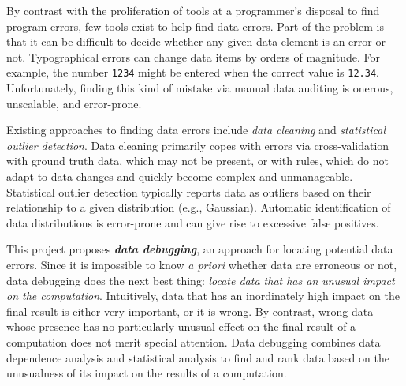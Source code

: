 


By contrast with the proliferation of tools at a programmer's disposal
to find program errors, few tools exist to help find data errors. Part
of the problem is that it can be difficult to decide whether any given
data element is an error or not. Typographical errors can change data items by
orders of magnitude. For example, the
number \texttt{1234} might be entered when the correct value is \texttt{12.34}. Unfortunately, finding this kind of mistake via
manual data auditing is onerous, unscalable, and error-prone.




Existing approaches to finding data errors include
\emph{data cleaning} and  \emph{statistical outlier detection}.
Data cleaning primarily copes with errors via
cross-validation with ground truth data, which may not be
present, or with rules, which do not adapt to data changes and quickly become complex and unmanageable. Statistical outlier detection typically reports data as
outliers based on their relationship to a given distribution (e.g.,
Gaussian).  Automatic identification of data distributions is
error-prone and can give rise to excessive false positives.



This project proposes \emph{\bf data debugging}, an approach for locating
potential data errors. Since it is impossible to know \emph{a priori}
whether data are erroneous or not, data debugging does the next best
thing: \emph{locate data that has an unusual
impact on the computation}. Intuitively, data that has an inordinately high impact on the final
result is either very important, or it is wrong. By contrast, wrong
data whose presence has no particularly unusual effect on the final result of a computation does not
merit special attention.  Data debugging combines data dependence
analysis and statistical analysis to find and rank data based on the unusualness of its
impact on the results of a computation.

